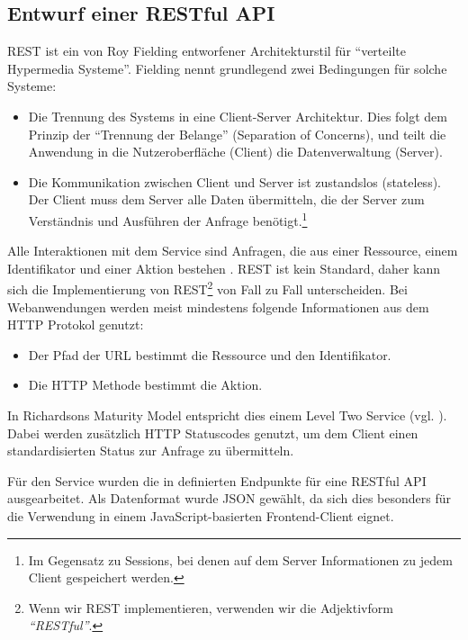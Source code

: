 \subsection{Entwurf einer RESTful API}

\ac{REST} ist ein von Roy Fielding entworfener Architekturstil für ``verteilte Hypermedia Systeme''. Fielding nennt grundlegend zwei Bedingungen für solche Systeme:

\begin{itemize}
  \item Die Trennung des Systems in eine Client-Server Architektur. Dies folgt dem Prinzip der ``Trennung der Belange'' (Separation of Concerns), und teilt die Anwendung in die Nutzeroberfläche (Client) die Datenverwaltung (Server).
  \item Die Kommunikation zwischen Client und Server ist zustandslos (stateless). Der Client muss dem Server alle Daten übermitteln, die der Server zum Verständnis und Ausführen der Anfrage benötigt.\footnote{Im Gegensatz zu Sessions, bei denen auf dem Server Informationen zu jedem Client gespeichert werden.}
\end{itemize}

Alle Interaktionen mit dem Service sind Anfragen, die aus einer Ressource, einem Identifikator und einer Aktion bestehen \citep[12]{Webber2010}. \ac{REST} ist kein Standard, daher kann sich die Implementierung von \ac{REST}\footnote{Wenn wir REST implementieren, verwenden wir die Adjektivform \emph{``RESTful''}.} von Fall zu Fall unterscheiden. Bei Webanwendungen werden meist mindestens folgende Informationen aus dem \ac{HTTP} Protokol genutzt:

\begin{itemize}
  \item Der Pfad der \acs{URL} bestimmt die Ressource und den Identifikator.
  \item Die \ac{HTTP} Methode bestimmt die Aktion.
\end{itemize}

In Richardsons Maturity Model entspricht dies einem Level Two Service (vgl. \citep[20]{Webber2010}). Dabei werden zusätzlich HTTP Statuscodes genutzt, um dem Client einen standardisierten Status zur Anfrage zu übermitteln.

Für den Service wurden die in  definierten Endpunkte für eine RESTful API ausgearbeitet. Als Datenformat wurde JSON gewählt, da sich dies besonders für die Verwendung in einem JavaScript-basierten Frontend-Client eignet.

